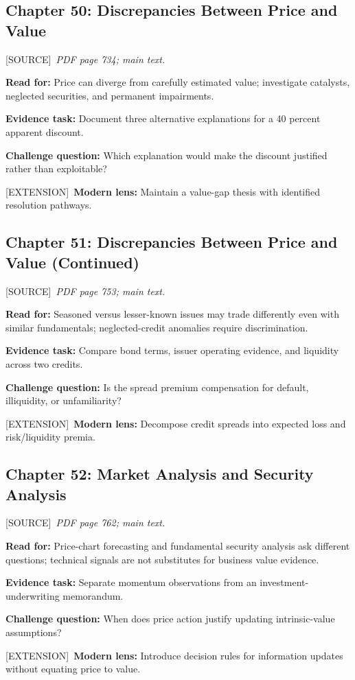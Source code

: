 \documentclass[11pt,letterpaper]{article}
\newcommand{\src}{\textsf{\color{sea}[SOURCE]}}
\newcommand{\ext}{\textsf{\color{gold}[EXTENSION]}}
\begin{document}
\subsection{Chapter 50: Discrepancies Between Price and Value}
\src\ \textit{PDF page 734; main text.}\par
\textbf{Read for:} Price can diverge from carefully estimated value; investigate catalysts, neglected securities, and permanent impairments.\par
\textbf{Evidence task:} Document three alternative explanations for a 40 percent apparent discount.\par
\textbf{Challenge question:} Which explanation would make the discount justified rather than exploitable?\par
\ext\ \textbf{Modern lens:} Maintain a value-gap thesis with identified resolution pathways.\par

\subsection{Chapter 51: Discrepancies Between Price and Value (Continued)}
\src\ \textit{PDF page 753; main text.}\par
\textbf{Read for:} Seasoned versus lesser-known issues may trade differently even with similar fundamentals; neglected-credit anomalies require discrimination.\par
\textbf{Evidence task:} Compare bond terms, issuer operating evidence, and liquidity across two credits.\par
\textbf{Challenge question:} Is the spread premium compensation for default, illiquidity, or unfamiliarity?\par
\ext\ \textbf{Modern lens:} Decompose credit spreads into expected loss and risk/liquidity premia.\par

\subsection{Chapter 52: Market Analysis and Security Analysis}
\src\ \textit{PDF page 762; main text.}\par
\textbf{Read for:} Price-chart forecasting and fundamental security analysis ask different questions; technical signals are not substitutes for business value evidence.\par
\textbf{Evidence task:} Separate momentum observations from an investment-underwriting memorandum.\par
\textbf{Challenge question:} When does price action justify updating intrinsic-value assumptions?\par
\ext\ \textbf{Modern lens:} Introduce decision rules for information updates without equating price to value.\par
\end{document}
